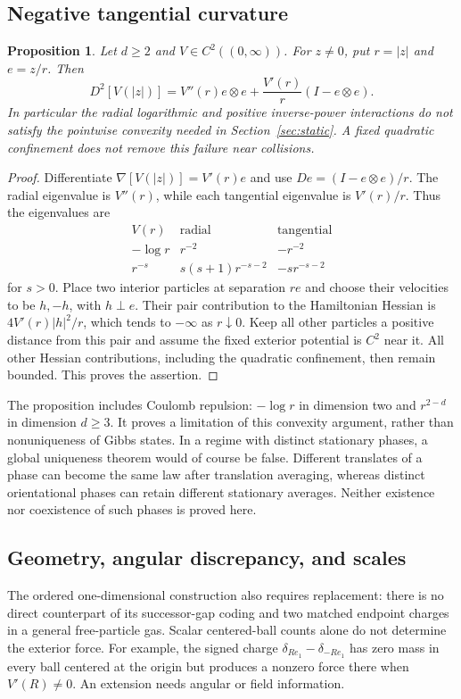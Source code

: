 \documentclass[11pt,reqno]{amsart}
\numberwithin{equation}{section}
\newtheorem{proposition}[theorem]{Proposition}
\theoremstyle{definition}
\newcommand{\1}{\mathbf 1}
\begin{document}
\subsection{Negative tangential curvature}\label{lim:tangential}
\begin{proposition}\label{lim:hessian}
Let $d\ge2$ and $V\in C^2((0,\infty))$. For $z\ne0$, put
$r=|z|$ and $e=z/r$. Then
\begin{equation}\label{lim:radial-Hessian}
D^2[V(|z|)]=V''(r)e\otimes e+
\frac{V'(r)}r(I-e\otimes e).
\end{equation}
In particular the radial logarithmic and positive inverse-power
interactions do not satisfy the pointwise convexity needed in
Section~\ref{sec:static}. A fixed quadratic confinement does not remove
this failure near collisions.
\end{proposition}

\begin{proof}
Differentiate $\nabla[V(|z|)]=V'(r)e$ and use
$D e=(I-e\otimes e)/r$. The radial eigenvalue is $V''(r)$, while
each tangential eigenvalue is $V'(r)/r$. Thus the eigenvalues are
\[
\begin{array}{c|cc}
V(r)&\text{radial}&\text{tangential}\\ \hline
-\log r&r^{-2}&-r^{-2}\\[2pt]
r^{-s}&s(s+1)r^{-s-2}&-sr^{-s-2}
\end{array}
\]
for $s>0$.
Place two interior particles at separation $re$ and choose their
velocities to be $h,-h$, with $h\perp e$.
Their pair contribution to the Hamiltonian Hessian is
$4V'(r)|h|^2/r$, which tends to $-\infty$ as $r\downarrow0$.
Keep all other particles a positive distance from this pair and
assume the fixed exterior potential is $C^2$ near it.
All other Hessian contributions, including the quadratic confinement,
then remain bounded. This proves the assertion.
\end{proof}

The proposition includes Coulomb repulsion: $-\log r$ in dimension
two and $r^{2-d}$ in dimension $d\ge3$. It proves a limitation of
this convexity argument, rather than nonuniqueness of Gibbs states.
In a regime with distinct stationary phases, a global uniqueness
theorem would of course be false. Different translates of a phase
can become the same law after translation averaging, whereas distinct
orientational phases can retain different stationary averages.
Neither existence nor coexistence of such phases is proved here.

\subsection{Geometry, angular discrepancy, and scales}
The ordered one-dimensional construction also requires replacement:
there is no direct counterpart of its successor-gap coding and
two matched endpoint charges in a general free-particle gas.
Scalar centered-ball counts alone do not determine the exterior force.
For example, the signed charge
$\delta_{Re_1}-\delta_{-Re_1}$ has zero mass in every ball centered
at the origin but produces a nonzero force there when $V'(R)\ne0$.
An extension needs angular or field information.
\end{document}
